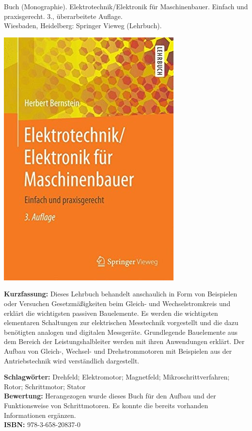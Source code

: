 {
Buch (Monographie). Elektrotechnik/Elektronik für Maschinenbauer. Einfach und praxisgerecht. 3., überarbeitete Auflage. \\Wiesbaden, Heidelberg: Springer Vieweg (Lehrbuch).\\
\begin{minipage}{0.38\textwidth}
	\includegraphics[width=\linewidth]{images/Bernstein.jpg}
\end{minipage}
\hfill
\begin{minipage}{0.6\textwidth}
\textbf{Kurzfassung:}
Dieses Lehrbuch behandelt anschaulich in Form von Beispielen oder Versuchen Gesetzmäßigkeiten beim Gleich- und Wechselstromkreis und erklärt die wichtigsten passiven Bauelemente. Es werden die wichtigsten elementaren Schaltungen zur elektrischen Messtechnik vorgestellt und die dazu benötigten analogen und digitalen Messgeräte. Grundlegende Bauelemente aus dem Bereich der Leistungshalbleiter werden mit ihren Anwendungen erklärt. Der Aufbau von Gleich-, Wechsel- und Drehstrommotoren mit Beispielen aus der Antriebstechnik wird verständlich dargestellt.
\end{minipage}
\textbf{Schlagwörter:}
Drehfeld; Elektromotor; Magnetfeld; Mikroschrittverfahren; Rotor; Schrittmotor; Stator
\\ \textbf{Bewertung:}
Herangezogen wurde dieses Buch für den Aufbau und der Funktionsweise von Schrittmotoren. Es konnte die bereits vorhanden Informationen ergänzen.
\\ \textbf{ISBN:}
978-3-658-20837-0
}


